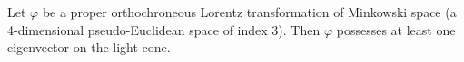 Let $\varphi$ be a proper orthochroneous Lorentz transformation of Minkowski space (a 4-dimensional pseudo-Euclidean space of index 3). Then $\varphi$ possesses at least one eigenvector on the light-cone.
